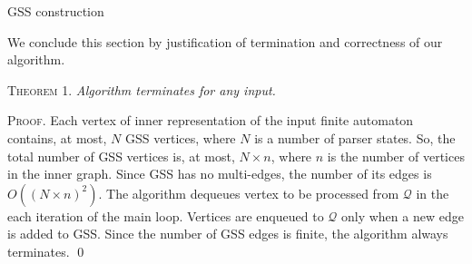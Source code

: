 \begin{algorithm}[!ht]
\begin{algorithmic}[1]
\caption{GSS construction}
\label{gss_construction}
  \Else
    \EndFor
  \EndIf
\EndFunction

    \EndIf
      \EndFor
    \EndIf
  \EndIf
\EndFunction
\end{algorithmic}
\end{algorithm}

We conclude this section by justification of termination and correctness of our algorithm.

\textsc{Theorem 1.}
\textit{Algorithm terminates for any input.}

\textsc{Proof.}
Each vertex of inner representation of the input finite automaton contains, at most, 
$N$ GSS vertices, where $N$ is a number of parser states. So, the total number of 
GSS vertices is, at most, $N\times n$, where $n$ is the number of vertices in the inner graph. 
Since GSS has no multi-edges, the number of its edges is $O((N\times n)^2)$. The algorithm 
dequeues vertex to be processed from $\mathcal Q$ in the each iteration of the 
main loop. Vertices are enqueued to $\mathcal Q$ only when a new edge is added to GSS. Since the number of 
GSS edges is finite, the algorithm always terminates. \qed

